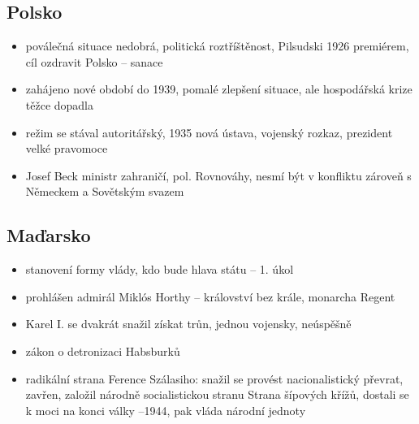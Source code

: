 \documentclass{article}
\begin{document}
\subsection*{Polsko}
\begin{itemize}
    \item poválečná situace nedobrá, politická roztříštěnost, Pilsudski 1926 premiérem, cíl ozdravit Polsko -- sanace
    \item zahájeno nové období do 1939, pomalé zlepšení situace, ale hospodářská krize těžce dopadla
    \item režim se stával autoritářský, 1935 nová ústava, vojenský rozkaz, prezident velké pravomoce
    \item Josef Beck ministr zahraničí, pol. Rovnováhy, nesmí být v konfliktu zároveň s Německem a Sovětským svazem
\end{itemize}

\subsection*{Maďarsko}
\begin{itemize}
    \item stanovení formy vlády, kdo bude hlava státu -- 1. úkol
    \item prohlášen admirál Miklós Horthy -- království bez krále, monarcha Regent
    \item Karel I. se dvakrát snažil získat trůn, jednou vojensky, neúspěšně
    \item zákon o detronizaci Habsburků
    \item radikální strana Ference Szálasiho: snažil se provést nacionalistický převrat, zavřen, založil národně socialistickou stranu Strana šípových křížů, dostali se k moci na konci války --1944, pak vláda národní jednoty
\end{itemize}
\end{document}
